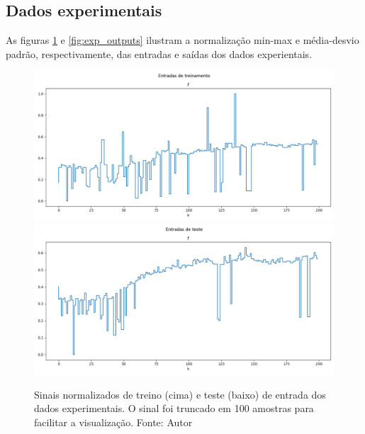 \subsection{Dados experimentais}
As figuras \ref{fig:exp_inputs} e \ref{fig:exp_outputs} ilustram a normalização min-max e média-desvio padrão, respectivamente, das entradas e saídas dos dados experientais.

\begin{figure}[hbt!]
    \centering
    \includegraphics[width=0.8\linewidth]{Imagens/chap04/experiment_inputs_train.png}
    \hfill
    \includegraphics[width=0.8\linewidth]{Imagens/chap04/experiment_inputs_test.png}
    \caption{Sinais normalizados de treino (cima) e teste (baixo) de entrada dos dados experimentais.
 O sinal foi truncado em 100 amostras para facilitar a visualização. Fonte: Autor}
    \label{fig:exp_inputs}
\end{figure}

